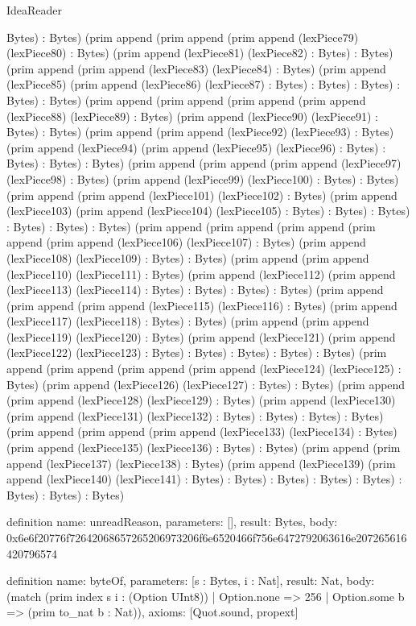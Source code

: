 \begin{lexlean}{IdeaReader}
\begin{semanticmodule}
{Bytes) : Bytes) (prim append (prim append (prim append (lexPiece79) (lexPiece80) : Bytes) (prim append (lexPiece81) (lexPiece82) : Bytes) : Bytes) (prim append (prim append (lexPiece83) (lexPiece84) : Bytes) (prim append (lexPiece85) (prim append (lexPiece86) (lexPiece87) : Bytes) : Bytes) : Bytes) : Bytes) : Bytes) (prim append (prim append (prim append (prim append (lexPiece88) (lexPiece89) : Bytes) (prim append (lexPiece90) (lexPiece91) : Bytes) : Bytes) (prim append (prim append (lexPiece92) (lexPiece93) : Bytes) (prim append (lexPiece94) (prim append (lexPiece95) (lexPiece96) : Bytes) : Bytes) : Bytes) : Bytes) (prim append (prim append (prim append (lexPiece97) (lexPiece98) : Bytes) (prim append (lexPiece99) (lexPiece100) : Bytes) : Bytes) (prim append (prim append (lexPiece101) (lexPiece102) : Bytes) (prim append (lexPiece103) (prim append (lexPiece104) (lexPiece105) : Bytes) : Bytes) : Bytes) : Bytes) : Bytes) : Bytes) (prim append (prim append (prim append (prim append (prim append (lexPiece106) (lexPiece107) : Bytes) (prim append (lexPiece108) (lexPiece109) : Bytes) : Bytes) (prim append (prim append (lexPiece110) (lexPiece111) : Bytes) (prim append (lexPiece112) (prim append (lexPiece113) (lexPiece114) : Bytes) : Bytes) : Bytes) : Bytes) (prim append (prim append (prim append (lexPiece115) (lexPiece116) : Bytes) (prim append (lexPiece117) (lexPiece118) : Bytes) : Bytes) (prim append (prim append (lexPiece119) (lexPiece120) : Bytes) (prim append (lexPiece121) (prim append (lexPiece122) (lexPiece123) : Bytes) : Bytes) : Bytes) : Bytes) : Bytes) (prim append (prim append (prim append (prim append (lexPiece124) (lexPiece125) : Bytes) (prim append (lexPiece126) (lexPiece127) : Bytes) : Bytes) (prim append (prim append (lexPiece128) (lexPiece129) : Bytes) (prim append (lexPiece130) (prim append (lexPiece131) (lexPiece132) : Bytes) : Bytes) : Bytes) : Bytes) (prim append (prim append (prim append (lexPiece133) (lexPiece134) : Bytes) (prim append (lexPiece135) (lexPiece136) : Bytes) : Bytes) (prim append (prim append (lexPiece137) (lexPiece138) : Bytes) (prim append (lexPiece139) (prim append (lexPiece140) (lexPiece141) : Bytes) : Bytes) : Bytes) : Bytes) : Bytes) : Bytes) : Bytes) : Bytes)
}

definition{
  name: unreadReason,
  parameters: [],
  result: Bytes,
  body: 0x6e6f20776f72642068657265206973206f6e6520466f756e6472792063616e207265616420796574
}

definition{
  name: byteOf,
  parameters: [s : Bytes, i : Nat],
  result: Nat,
  body: (match (prim index s i : (Option UInt8))
    | Option.none => 256
    | Option.some b => (prim to_nat b : Nat)),
  axioms: [Quot.sound, propext]
}


\end{semanticmodule}
\end{lexlean}

